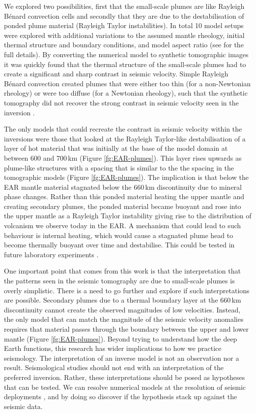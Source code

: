 We explored two possibilities, first that the small-scale plumes are like Rayleigh Bénard convection cells and secondly that they are due to the destabilisation of ponded plume material (Rayleigh Taylor instabilities). In total 10 model setups were explored with additional variations to the assumed mantle rheology, initial thermal structure and boundary conditions, and model aspect ratio (see \citealp{civiero-etal-2019} for the full details). By converting the numerical model to synthetic tomographic images it was quickly found that the thermal structure of the small-scale plumes had to create a significant and sharp contrast in seismic velocity. Simple Rayleigh Bénard convection created plumes that were either too thin (for a non-Newtonian rheology) or were too diffuse (for a Newtonian rheology), such that the synthetic tomography did not recover the strong contrast in seismic velocity seen in the inversion \citep{civiero-etal-2019}.

The only models that could recreate the contrast in seismic velocity within the inversions were those that looked at the Rayleigh Taylor-like destabilisation of a layer of hot material that was initially at the base of the model domain at between 600 and 700\,km (Figure \ref{fg:EAR-plumes}). This layer rises upwards as plume-like structures with a spacing that is similar to the the spacing in the tomographic models (Figure \ref{fg:EAR-plumes}). The implication is that below the EAR mantle material stagnated below the 660\,km discontinuity due to mineral phase changes. Rather than this ponded material heating the upper mantle and creating secondary plumes, the ponded material became buoyant and rose into the upper mantle as a Rayleigh Taylor instability giving rise to the distribution of volcanism we observe today in the EAR. A mechanism that could lead to such behaviour is internal heating, which would cause a stagnated plume head to become thermally buoyant over time and destabilise. This could be tested in future laboratory experiments \citep[e.g.][]{limare-etal-2019}.

One important point that comes from this work is that the interpretation that the patterns seen in the seismic tomography are due to small-scale plumes is overly simplistic. There is a need to go further and explore if such interpretations are possible. Secondary plumes due to a thermal boundary layer at the 660\,km discontinuity cannot create the observed magnitudes of low velocities. Instead, the only model that can match the magnitude of the seismic velocity anomalies requires that material passes through the boundary between the upper and lower mantle (Figure \ref{fg:EAR-plumes}). Beyond trying to understand how the deep Earth functions, this research has wider implications to how we practice seismology. The interpretation of an inverse model is not an observation nor a result. Seismological studies should not end with an interpretation of the preferred inversion. Rather, these interpretations should be posed as hypotheses that can be tested. We can resolve numerical models at the resolution of seismic deployments \citep[e.g.][]{goes-etal-2012,civiero-etal-2019}, and by doing so discover if the hypothesis stack up against the seismic data.

